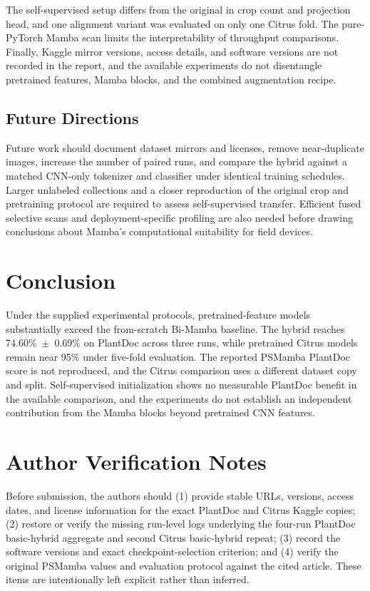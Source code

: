 \documentclass[conference]{IEEEtran}
\begin{document}
The self-supervised setup differs from the original in crop count and projection head, and one alignment variant was evaluated on only one Citrus fold. The pure-PyTorch Mamba scan limits the interpretability of throughput comparisons. Finally, Kaggle mirror versions, access details, and software versions are not recorded in the report, and the available experiments do not disentangle pretrained features, Mamba blocks, and the combined augmentation recipe.

\subsection{Future Directions}
Future work should document dataset mirrors and licenses, remove near-duplicate images, increase the number of paired runs, and compare the hybrid against a matched CNN-only tokenizer and classifier under identical training schedules. Larger unlabeled collections and a closer reproduction of the original crop and pretraining protocol are required to assess self-supervised transfer. Efficient fused selective scans and deployment-specific profiling are also needed before drawing conclusions about Mamba's computational suitability for field devices.

\section{Conclusion}
Under the supplied experimental protocols, pretrained-feature models substantially exceed the from-scratch Bi-Mamba baseline. The hybrid reaches 74.60\%~$\pm$~0.69\% on PlantDoc across three runs, while pretrained Citrus models remain near 95\% under five-fold evaluation. The reported PSMamba PlantDoc score is not reproduced, and the Citrus comparison uses a different dataset copy and split. Self-supervised initialization shows no measurable PlantDoc benefit in the available comparison, and the experiments do not establish an independent contribution from the Mamba blocks beyond pretrained CNN features.

\section*{Author Verification Notes}
Before submission, the authors should (1) provide stable URLs, versions, access dates, and license information for the exact PlantDoc and Citrus Kaggle copies; (2) restore or verify the missing run-level logs underlying the four-run PlantDoc basic-hybrid aggregate and second Citrus basic-hybrid repeat; (3) record the software versions and exact checkpoint-selection criterion; and (4) verify the original PSMamba values and evaluation protocol against the cited article. These items are intentionally left explicit rather than inferred.



\end{document}
